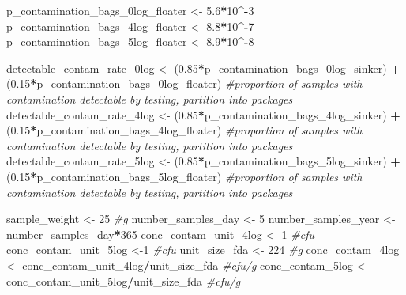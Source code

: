 \documentclass[
]{article}
\newenvironment{Shaded}{\begin{snugshade}}{\end{snugshade}}
\newcommand{\CommentTok}[1]{\textcolor[rgb]{0.56,0.35,0.01}{\textit{#1}}}
\newcommand{\DecValTok}[1]{\textcolor[rgb]{0.00,0.00,0.81}{#1}}
\newcommand{\FloatTok}[1]{\textcolor[rgb]{0.00,0.00,0.81}{#1}}
\newcommand{\NormalTok}[1]{#1}
\newcommand{\OtherTok}[1]{\textcolor[rgb]{0.56,0.35,0.01}{#1}}
\newcommand{\SpecialCharTok}[1]{\textcolor[rgb]{0.81,0.36,0.00}{\textbf{#1}}}
\begin{document}
\begin{Shaded}
\begin{Highlighting}[]
\NormalTok{p\_contamination\_bags\_0log\_floater }\OtherTok{\textless{}{-}} \FloatTok{5.6}\SpecialCharTok{*}\DecValTok{10}\SpecialCharTok{\^{}{-}}\DecValTok{3}
\NormalTok{p\_contamination\_bags\_4log\_floater }\OtherTok{\textless{}{-}} \FloatTok{8.8}\SpecialCharTok{*}\DecValTok{10}\SpecialCharTok{\^{}{-}}\DecValTok{7}
\NormalTok{p\_contamination\_bags\_5log\_floater }\OtherTok{\textless{}{-}} \FloatTok{8.9}\SpecialCharTok{*}\DecValTok{10}\SpecialCharTok{\^{}{-}}\DecValTok{8}

\NormalTok{detectable\_contam\_rate\_0log }\OtherTok{\textless{}{-}}\NormalTok{ (}\FloatTok{0.85}\SpecialCharTok{*}\NormalTok{p\_contamination\_bags\_0log\_sinker) }\SpecialCharTok{+}\NormalTok{ (}\FloatTok{0.15}\SpecialCharTok{*}\NormalTok{p\_contamination\_bags\_0log\_floater) }\CommentTok{\#proportion of samples with contamination detectable by testing, partition into packages}
\NormalTok{detectable\_contam\_rate\_4log }\OtherTok{\textless{}{-}}\NormalTok{ (}\FloatTok{0.85}\SpecialCharTok{*}\NormalTok{p\_contamination\_bags\_4log\_sinker) }\SpecialCharTok{+}\NormalTok{ (}\FloatTok{0.15}\SpecialCharTok{*}\NormalTok{p\_contamination\_bags\_4log\_floater) }\CommentTok{\#proportion of samples with contamination detectable by testing, partition into packages}
\NormalTok{detectable\_contam\_rate\_5log }\OtherTok{\textless{}{-}}\NormalTok{ (}\FloatTok{0.85}\SpecialCharTok{*}\NormalTok{p\_contamination\_bags\_5log\_sinker) }\SpecialCharTok{+}\NormalTok{ (}\FloatTok{0.15}\SpecialCharTok{*}\NormalTok{p\_contamination\_bags\_5log\_floater) }\CommentTok{\#proportion of samples with contamination detectable by testing, partition into packages}



\NormalTok{sample\_weight }\OtherTok{\textless{}{-}} \DecValTok{25} \CommentTok{\#g}
\NormalTok{number\_samples\_day }\OtherTok{\textless{}{-}} \DecValTok{5}
\NormalTok{number\_samples\_year }\OtherTok{\textless{}{-}}\NormalTok{ number\_samples\_day}\SpecialCharTok{*}\DecValTok{365}
\NormalTok{conc\_contam\_unit\_4log }\OtherTok{\textless{}{-}} \DecValTok{1} \CommentTok{\#cfu}
\NormalTok{conc\_contam\_unit\_5log }\OtherTok{\textless{}{-}}\DecValTok{1} \CommentTok{\#cfu}
\NormalTok{unit\_size\_fda }\OtherTok{\textless{}{-}} \DecValTok{224} \CommentTok{\#g}
\NormalTok{conc\_contam\_4log }\OtherTok{\textless{}{-}}\NormalTok{ conc\_contam\_unit\_4log}\SpecialCharTok{/}\NormalTok{unit\_size\_fda }\CommentTok{\#cfu/g}
\NormalTok{conc\_contam\_5log }\OtherTok{\textless{}{-}}\NormalTok{ conc\_contam\_unit\_5log}\SpecialCharTok{/}\NormalTok{unit\_size\_fda }\CommentTok{\#cfu/g}


\end{Highlighting}
\end{Shaded}
\end{document}
